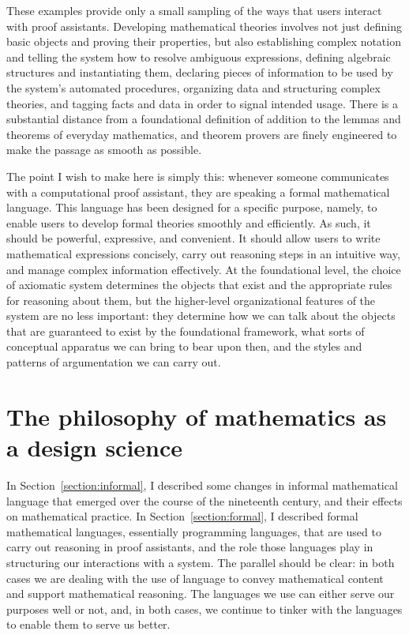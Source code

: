 \documentclass[11pt]{article}
\begin{document}
These examples provide only a small sampling of the ways that users interact with proof assistants. Developing mathematical theories involves not just defining basic objects and proving their properties, but also establishing complex notation and telling the system how to resolve ambiguous expressions, defining algebraic structures and instantiating them, declaring pieces of information to be used by the system's automated procedures, organizing data and structuring complex theories, and tagging facts and data in order to signal intended usage. There is a substantial distance from a foundational definition of addition to the lemmas and theorems of everyday mathematics, and theorem provers are finely engineered to make the passage as smooth as possible.

The point I wish to make here is simply this: whenever someone communicates with a computational proof assistant, they are speaking a formal mathematical language. This language has been designed for a specific purpose, namely, to enable users to develop formal theories smoothly and efficiently. As such, it should be powerful, expressive, and convenient. It should allow users to write mathematical expressions concisely, carry out reasoning steps in an intuitive way, and manage complex information effectively. At the foundational level, the choice of axiomatic system determines the objects that exist and the appropriate rules for reasoning about them, but the higher-level organizational features of the system are no less important: they determine how we can talk about the objects that are guaranteed to exist by the foundational framework, what sorts of conceptual apparatus we can bring to bear upon then, and the styles and patterns of argumentation we can carry out.

\section{The philosophy of mathematics as a design science}
\label{section:philosophy}

In Section~\ref{section:informal}, I described some changes in informal mathematical language that emerged over the course of the nineteenth century, and their effects on mathematical practice. In Section~\ref{section:formal}, I described formal mathematical languages, essentially programming languages, that are used to carry out reasoning in proof assistants, and the role those languages play in structuring our interactions with a system. The parallel should be clear: in both cases we are dealing with the use of language to convey mathematical content and support mathematical reasoning. The languages we use can either serve our purposes well or not, and, in both cases, we continue to tinker with the languages to enable them to serve us better.
\end{document}
